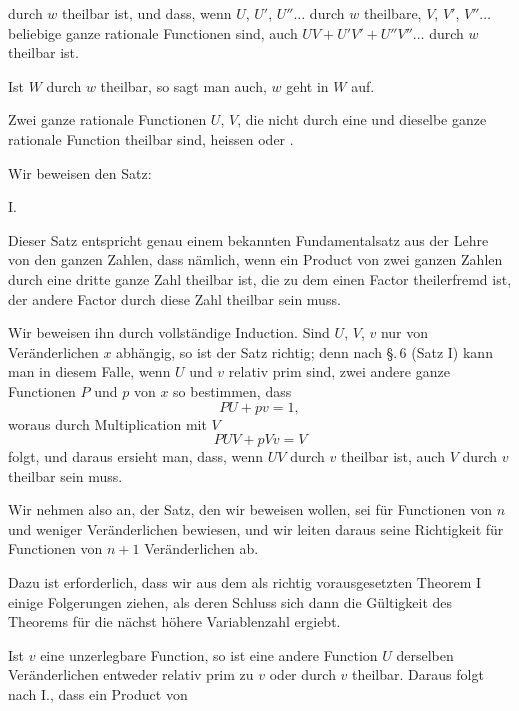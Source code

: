 durch $w$ theilbar ist, und dass, wenn $U$, $U'$, $U''\ldots$ durch $w$
theilbare, $V$, $V'$, $V''\ldots$ beliebige ganze rationale Functionen sind,
auch $UV + U'V' + U''V''\ldots$ durch $w$ theilbar ist.

Ist $W$ durch $w$ theilbar, so sagt man auch, $w$ geht in $W$ auf.

Zwei ganze rationale Functionen $U$, $V$, die nicht durch eine und dieselbe
ganze rationale Function theilbar sind, heissen 
oder .

Wir beweisen den Satz:

I. 

Dieser Satz entspricht genau einem bekannten Fundamentalsatz aus der Lehre
von den ganzen Zahlen, dass nämlich, wenn ein Product von zwei ganzen
Zahlen durch eine dritte ganze Zahl theilbar ist, die zu dem einen Factor
theilerfremd ist, der andere Factor durch diese Zahl theilbar sein muss.

Wir beweisen ihn durch vollständige Induction. Sind $U$, $V$, $v$ nur von
 Veränderlichen $x$ abhängig, so ist der Satz richtig; denn
nach \S.\,6 (Satz I) kann man in diesem Falle, wenn $U$ und $v$ relativ
prim sind, zwei andere ganze Functionen $P$ und $p$ von $x$ so bestimmen,
dass
\[
PU + pv = 1,
\]
woraus durch Multiplication mit $V$
\[
PUV + pVv = V
\]
folgt, und daraus ersieht man, dass, wenn $UV$ durch $v$ theilbar ist,
auch $V$ durch $v$ theilbar sein muss.

Wir nehmen also an, der Satz, den wir beweisen wollen, sei für Functionen
von $n$ und weniger Veränderlichen bewiesen, und wir leiten daraus seine
Richtigkeit für Functionen von $n + 1$ Veränderlichen ab.

Dazu ist erforderlich, dass wir aus dem als richtig vorausgesetzten
Theorem I einige Folgerungen ziehen, als deren Schluss sich dann die
Gültigkeit des Theorems für die nächst höhere Variablenzahl ergiebt.

Ist $v$ eine unzerlegbare Function, so ist eine andere Function $U$
derselben Veränderlichen entweder relativ prim zu $v$ oder durch $v$
theilbar. Daraus folgt nach I., dass ein Product von
